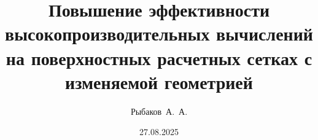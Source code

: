 \documentclass[a4paper,14pt]{extarticle}                     %
\numberwithin{equation}{section}                             %
\numberwithin{figure}{section}                               %
\numberwithin{table}{section}                                %
\theoremstyle{plain}                                         %
\numberwithin{theorem}{section}                              %
\numberwithin{lemma}{section}                                %
\numberwithin{definition}{section}                           %
\begin{document}

\title{Повышение эффективности высокопроизводительных вычислений на поверхностных расчетных сетках с изменяемой геометрией}
\author{Рыбаков~А.~А.}
\date{27.08.2025}
\maketitle
\thispagestyle{empty}                                        %

\newpage
\renewcommand{\contentsname}{Оглавление}                     %
\tableofcontents





%
%
%
%
%
%
%
%
\end{document}
